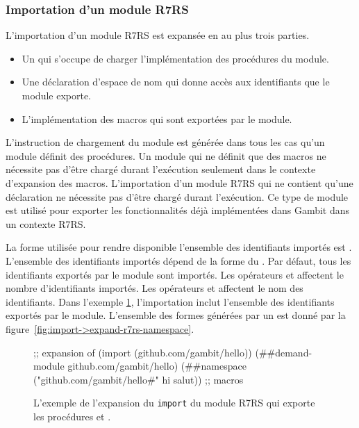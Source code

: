 \subsubsection{Importation d'un module R7RS}

L'importation d'un module R7RS est expansée en au plus trois parties.
\begin{itemize}

  \item Un  qui s'occupe de charger l'implémentation des
    procédures du module.

  \item Une déclaration d'espace de nom qui donne accès aux identifiants que le
    module exporte.

  \item L'implémentation des macros qui sont exportées par le module.
\end{itemize}

L'instruction de chargement du module est générée dans tous les cas qu'un
module définit des procédures. Un module qui ne définit que des macros ne
nécessite pas d'être chargé durant l'exécution seulement dans le contexte
d'expansion des macros. L'importation d'un module R7RS qui ne contient qu'une
déclaration  ne nécessite pas d'être chargé durant l'exécution.
Ce type de module est utilisé pour exporter les fonctionnalités déjà
implémentées dans Gambit dans un contexte R7RS.

La forme utilisée pour rendre disponible l'ensemble des identifiants importés
est . L'ensemble des identifiants importés dépend de la
forme du . Par défaut, tous les identifiants exportés par le
module sont importés.  Les opérateurs  et 
affectent le nombre d'identifiants importés. Les opérateurs  et
 affectent le nom des identifiants.  Dans l'exemple
\ref{fig:import->expand-r7rs}, l'importation inclut l'ensemble des identifiants
exportés par le module. L'ensemble des formes  générées
par un  est donné par la
figure~\ref{fig:import->expand-r7rs-namespace}.\\

\begin{figure}[ht]
  \centering
  \fontsize{12}{10}
  \begin{mplisting}{1}
;; expansion of (import (github.com/gambit/hello))
(##demand-module github.com/gambit/hello)
(##namespace ("github.com/gambit/hello#" hi salut))
;; macros
\end{mplisting}
  \caption{L'exemple de l'expansion du \texttt{import} du module R7RS
     qui exporte les procédures
     et .}
  \label{fig:import->expand-r7rs}
\end{figure}

